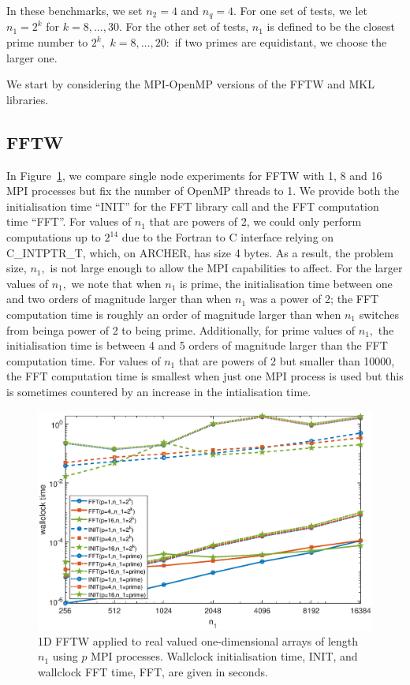 \documentclass[a4]{article}
\begin{document}
In these benchmarks, we set $n_2=4$ and $n_q=4.$ For one set of tests, we let
 $n_1=2^k$ for $k=8,\ldots,30.$ For the other set of tests, $n_1$ is defined 
to be the closest prime number to $2^k,$ $k=8,\ldots,20:$ if two primes are 
equidistant, we choose the larger one.

We start by considering the MPI-OpenMP versions of the FFTW and MKL libraries.

\subsection{FFTW}

 In Figure~\ref{Fig:fftw1d_times}, we compare single node experiments for FFTW with 1, 8 and 16 
MPI processes but fix the number of OpenMP threads to 1. We provide both the 
initialisation time ``INIT'' for the FFT library call and the FFT computation 
time ``FFT''. For values of $n_1$ that are powers of 2, we could only perform 
computations up to $2^14$ due to the Fortran to C interface relying on 
C\_INTPTR\_T, which, on ARCHER, has size 4 bytes. As a result, the problem size, 
$n_1,$ is not large enough to allow the MPI capabilities to affect. For the 
larger values of $n_1,$ we note that when $n_1$ is prime, the 
initialisation time between one and two orders of magnitude larger than when $n_1$ was a power of 2; the FFT computation time is roughly an order of magnitude 
larger than when $n_1$ switches from beinga power of 2 to being prime. Additionally, for prime values of $n_1,$ the initialisation time is between 4 and 5 orders of magnitude larger than the FFT computation time. For values of $n_1$ that are powers of 2 but smaller than 10000, the FFT computation time is smallest when just one  MPI process is used but this is sometimes countered by an increase in the intialisation time.

\begin{figure}[!htbp]
\begin{center}
 \includegraphics[width=.9\textwidth, height=0.42\textheight]{FFTW1D_times_fig.eps}
\caption{1D FFTW applied to real valued one-dimensional arrays of length $n_1$ using $p$ MPI processes. Wallclock initialisation time, INIT, and wallclock FFT time, FFT, are given in seconds.}
\label{Fig:fftw1d_times}
\end{center}
\end{figure}
\end{document}
